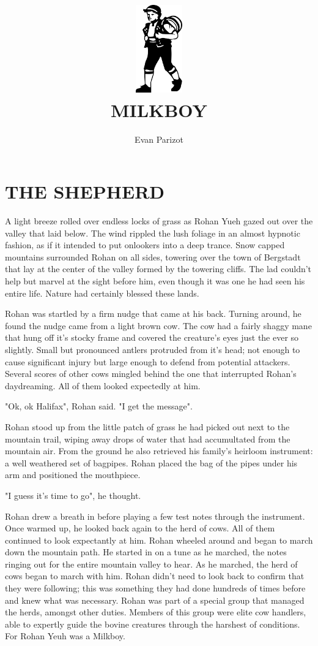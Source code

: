 \documentclass[ms,a4paper]{memoir}
\title{\includegraphics[width=2cm]{MILKBOY.png}\\[2cm]MILKBOY}
\author{Evan Parizot}
\date{}
\newcommand{\RED}[1]{\textcolor{red!50!black}{\MakeUppercase{#1}}}
\begin{document}
\maketitle
\chapter{\RED{The Shepherd}}

A light breeze rolled over endless locks of grass as Rohan Yueh gazed out over 
the valley that laid below. The wind rippled the lush foliage in an almost hypnotic 
fashion, as if it intended to put onlookers into a deep trance. Snow capped mountains
surrounded Rohan on all sides, towering over the town of Bergstadt that lay at 
the center of the valley formed by the towering cliffs. The lad couldn't help but 
marvel at the sight before him, even though it was one he had seen his entire life. 
Nature had certainly blessed these lands.

Rohan was startled by a firm nudge that came at his back. Turning around, he found 
the nudge came from a light brown cow. The cow had a fairly shaggy mane that hung off 
it's stocky frame and covered the creature's eyes just the ever so slightly. Small but pronounced 
antlers protruded from it's head; not enough to cause significant injury but large 
enough to defend from potential attackers. Several scores of other cows mingled behind 
the one that interrupted Rohan's daydreaming. All of them looked expectedly at him.

"Ok, ok Halifax", Rohan said. "I get the message".

Rohan stood up from the little patch of grass he had picked out next to the mountain 
trail, wiping away drops of water that had accumultated from the mountain air. From 
the ground he also retrieved his family's heirloom instrument: a well weathered set 
of bagpipes. Rohan placed the bag of the pipes under his arm and positioned the 
mouthpiece.

"I guess it's time to go", he thought.

Rohan drew a breath in before playing a few test notes through the instrument. Once warmed up,
he looked back again to the herd of cows. All of them continued to look expectantly at him.
Rohan wheeled around and began to march down the mountain path. He started in on a 
tune as he marched, the notes ringing out for the entire mountain valley to hear. As 
he marched, the herd of cows began to march with him. Rohan didn't need to look back 
to confirm that they were following; this was something they had done hundreds of times 
before and knew what was necessary. Rohan was part of a special group that managed 
the herds, amongst other duties. Members of this group were elite cow handlers, 
able to expertly guide the bovine creatures through the harshest of 
conditions. For Rohan Yeuh was a Milkboy.
\end{document}
